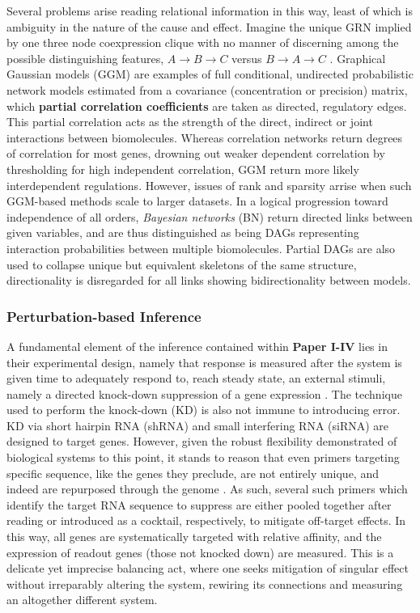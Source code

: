 Several problems arise reading relational information in this way, least of which is ambiguity in the nature of the cause and effect. Imagine the unique GRN implied by one three node coexpression clique with no manner of discerning among the possible distinguishing features, \eg $A\to B\to C$ versus $ B\to A\to C$ \citep{markowetz2007inferring}.
Graphical Gaussian models (GGM) are examples of full conditional, undirected probabilistic network models estimated from a covariance (\ie concentration or precision) matrix, which \textbf{partial correlation coefficients} are taken as directed, regulatory edges. This partial correlation acts as the strength of the direct, indirect or joint interactions between biomolecules. Whereas correlation networks return degrees of correlation for most genes, drowning out weaker dependent correlation by thresholding for high independent correlation, GGM return more likely interdependent regulations\citep{schafer2004empirical}. However, issues of rank and sparsity arrise when such GGM-based methods scale to larger datasets. In a logical progression toward independence of all orders, \emph{Bayesian networks} (BN) return directed links between given variables, and are thus distinguished as being DAGs representing interaction probabilities between multiple biomolecules. Partial DAGs are also used to collapse unique but equivalent skeletons of the same structure, \ie directionality is disregarded for all links showing bidirectionality between models.


\subsubsection{Perturbation-based Inference}
\label{sec:ODE}
A fundamental element of the inference contained within \textbf{Paper I-IV} lies in their experimental design, namely that response is measured after the system is given time to adequately respond to, \ie reach steady state, an external stimuli, namely a directed knock-down suppression of a gene expression \citep{pinna2010knockouts,oates2012network,yip2010improved}. The technique used to perform the knock-down (KD) is also not immune to introducing error. KD via short hairpin RNA (shRNA) and small interfering RNA (siRNA) are designed to target genes. However, given the robust flexibility demonstrated of biological systems to this point, it stands to reason that even primers targeting specific sequence, like the genes they preclude, are not entirely unique, and indeed are repurposed through the genome \citep{ye2012primer}. As such, several such primers which identify the target RNA sequence to suppress are either pooled together after reading or introduced as a cocktail, respectively, to mitigate off-target effects. In this way, all genes are systematically targeted with relative affinity, and the expression of readout genes (those not knocked down) are measured. This is a delicate yet imprecise balancing act, where one seeks mitigation of singular effect without irreparably altering the system, rewiring its connections and measuring an altogether different system. 

